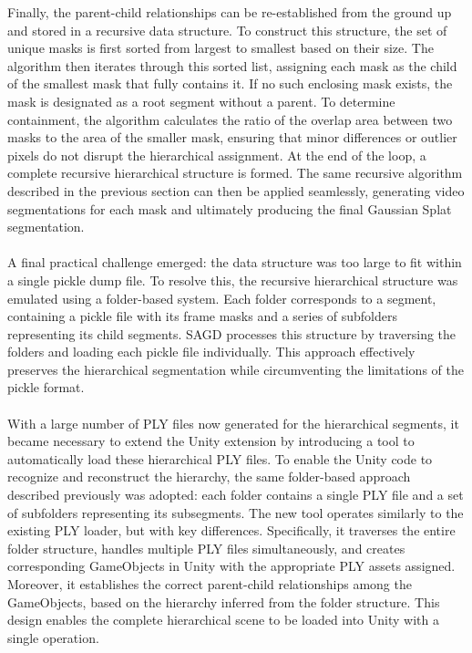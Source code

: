 \documentclass[12pt]{article}
\begin{document}
Finally, the parent-child relationships can be re-established from the ground up and stored in a recursive data structure. To construct this structure, the set of unique masks is first sorted from largest to smallest based on their size. The algorithm then iterates through this sorted list, assigning each mask as the child of the smallest mask that fully contains it. If no such enclosing mask exists, the mask is designated as a root segment without a parent. To determine containment, the algorithm calculates the ratio of the overlap area between two masks to the area of the smaller mask, ensuring that minor differences or outlier pixels do not disrupt the hierarchical assignment. At the end of the loop, a complete recursive hierarchical structure is formed. The same recursive algorithm described in the previous section can then be applied seamlessly, generating video segmentations for each mask and ultimately producing the final Gaussian Splat segmentation.
\\\\
A final practical challenge emerged: the data structure was too large to fit within a single pickle dump file. To resolve this, the recursive hierarchical structure was emulated using a folder-based system. Each folder corresponds to a segment, containing a pickle file with its frame masks and a series of subfolders representing its child segments. SAGD processes this structure by traversing the folders and loading each pickle file individually. This approach effectively preserves the hierarchical segmentation while circumventing the limitations of the pickle format.
\\\\
With a large number of PLY files now generated for the hierarchical segments, it became necessary to extend the Unity extension by introducing a tool to automatically load these hierarchical PLY files. To enable the Unity code to recognize and reconstruct the hierarchy, the same folder-based approach described previously was adopted: each folder contains a single PLY file and a set of subfolders representing its subsegments. The new tool operates similarly to the existing PLY loader, but with key differences. Specifically, it traverses the entire folder structure, handles multiple PLY files simultaneously, and creates corresponding GameObjects in Unity with the appropriate PLY assets assigned. Moreover, it establishes the correct parent-child relationships among the GameObjects, based on the hierarchy inferred from the folder structure. This design enables the complete hierarchical scene to be loaded into Unity with a single operation.
\end{document}
